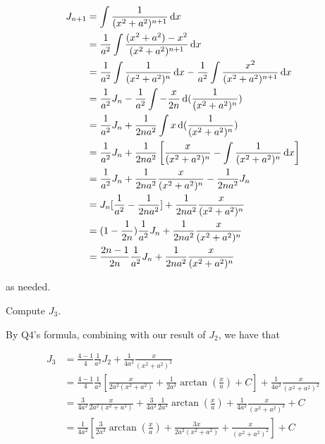 \documentclass{alittlebear}
\begin{document}
\begin{exercise}{}{}
\begin{question}{}{}
        \begin{mathnote}
            \begin{align*}
                J_{n+1}&=\int \frac{1}{(x^2+a^2)^{n+1}}\mathop{}\!\mathrm{d} x\\
                &= \frac1{a^2}\int \frac{(x^2+a^2)-x^2}{(x^2+a^2)^{n+1}}\mathop{}\!\mathrm{d} x\\
                &=\frac1{a^2}\int\frac1{(x^2+a^2)^n}\mathop{}\!\mathrm{d} x - \frac1{a^2}\int\frac{x^2}{(x^2+a^2)^{n+1}}\mathop{}\!\mathrm{d} x\\
                &=\frac1{a^2}J_n - \frac1{a^2}\int -\frac{x}{2n}\mathop{}\!\mathrm{d} (\frac{1}{(x^2+a^2)^n})\\
                &=\frac1{a^2}J_n + \frac1{2na^2}\int x\mathop{}\!\mathrm{d} (\frac{1}{(x^2+a^2)^n})\\
                &=\frac1{a^2}J_n + \frac{1}{2na^2}\left[\frac{x}{(x^2+a^2)^n}-\int\frac1{(x^2+a^2)^n}\mathop{}\!\mathrm{d} x \right]\\
                &=\frac1{a^2}J_n + \frac1{2na^2}\frac{x}{(x^2+a^2)^n}-\frac{1}{2na^2}J_n\\
                &=J_n[\frac{1}{a^2}-\frac{1}{2na^2}]+\frac{1}{2na^2}\frac{x}{(x^2+a^2)^n}\\
                &=(1-\frac1{2n})\frac1{a^2}J_n + \frac1{2na^2}\frac{x}{(x^2+a^2)^n}\\
                &=\frac{2n-1}{2n}\frac1{a^2}J_n + \frac1{2na^2}\frac{x}{(x^2+a^2)^n}
            \end{align*}

            as needed.
        \end{mathnote}

    \end{question}

    \begin{question}{}{}
        Compute $J_{3}$.
        \tcblower
        \begin{mathnote}
            By Q4's formula, combining with our result of $J_2$, we have that

            \begin{align*}
                J_3&=\frac{4-1}{4}\frac{1}{a^2}J_2+\frac{1}{4a^2}\frac{x}{(x^2+a^2)^2}\\
                &=\frac{4-1}{4}\frac{1}{a^2}[\frac{x}{2a^2(x^2+a^2)}+\frac{1}{2a^3}\arctan(\frac{x}a) + C]+\frac{1}{4a^2}\frac{x}{(x^2+a^2)^2}\\
                &=\frac{3}{4a^2}\frac{x}{2a^2(x^2+a^2)}+\frac{3}{4a^2}\frac{1}{2a^3}\arctan(\frac{x}a)+\frac{1}{4a^2}\frac{x}{(x^2+a^2)^2} + C\\
                &=\frac{1}{4a^2}\left[\frac{3}{2a^3}\arctan(\frac{x}a)+\frac{3x}{2a^2(x^2+a^2)}+\frac{x}{(x^2+a^2)^2}\right] + C\\
            \end{align*}
        \end{mathnote}
    \end{question}
\end{exercise}
\end{document}
